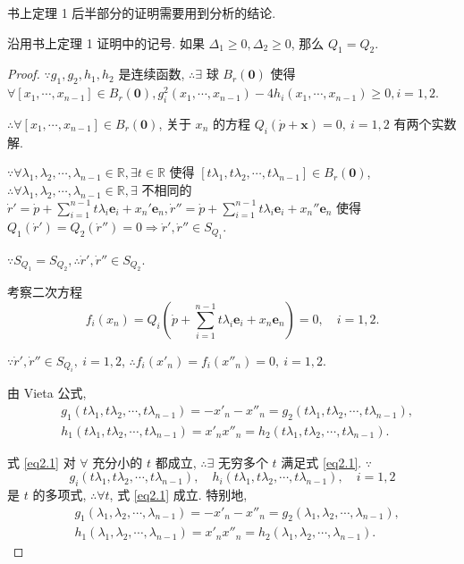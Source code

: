 \documentclass{ctexart}
\begin{document}
书上定理 1 后半部分的证明需要用到分析的结论.
\begin{theorem}
    沿用书上定理 1 证明中的记号. 如果 $\Delta_1\geq0,\Delta_2\geq0$, 那么 $Q_1=Q_2$.
\end{theorem}
\begin{proof}
    $\because g_1,g_2,h_1,h_2$ 是连续函数, $\therefore\exists$ 球 $B_r(\boldsymbol{0})$ 使得 $\forall[x_1,\cdots,x_{n-1}]\in B_r(\boldsymbol{0}),g_i^2(x_1,\cdots,x_{n-1})-4h_i(x_1,\cdots,x_{n-1})\geq0,i=1,2$.

    $\therefore\forall[x_1,\cdots,x_{n-1}]\in B_r(\boldsymbol{0})$, 关于 $x_n$ 的方程 $Q_i(\dot{p}+\boldsymbol{x})=0,\ i=1,2$ 有两个实数解.

    $\because\forall\lambda_1,\lambda_2,\cdots,\lambda_{n-1}\in\mathbb{R},\exists t\in\mathbb{R}$ 使得 $[t\lambda_1,t\lambda_2,\cdots,t\lambda_{n-1}]\in B_r(\boldsymbol{0})$, $\therefore\forall\lambda_1,\lambda_2,\cdots,\lambda_{n-1}\in\mathbb{R},\exists$ 不相同的 $\dot{r}'=\dot{p}+\sum\limits_{i=1}^{n-1}t\lambda_i\boldsymbol{e}_i+x_n'\boldsymbol{e}_n,\dot{r}''=\dot{p}+\sum\limits_{i=1}^{n-1}t\lambda_i\boldsymbol{e}_i+x_n''\boldsymbol{e}_n$ 使得 $Q_1(\dot{r}')=Q_2(\dot{r}'')=0\Rightarrow\dot{r}',\dot{r}''\in S_{Q_1}$.

    $\because S_{Q_1}=S_{Q_2},\therefore\dot{r}',\dot{r}''\in S_{Q_2}$.

    考察二次方程
    \[f_i(x_n)=Q_i\left(\dot{p}+\sum\limits_{i=1}^{n-1}t\lambda_i\boldsymbol{e}_i+x_n\boldsymbol{e}_n\right)=0,\quad i=1,2.\]

    $\because\dot{r}',\dot{r}''\in S_{Q_i},\ i=1,2$, $\therefore f_i(x'_n)=f_i(x''_n)=0,\ i=1,2$.

    由 Vieta 公式,
    \begin{equation}\label{eq2.1}
        \begin{aligned}
            & g_1(t\lambda_1,t\lambda_2,\cdots,t\lambda_{n-1})=-x'_n-x''_n=g_2(t\lambda_1,t\lambda_2,\cdots,t\lambda_{n-1}), \\
            & h_1(t\lambda_1,t\lambda_2,\cdots,t\lambda_{n-1})=x'_nx''_n=h_2(t\lambda_1,t\lambda_2,\cdots,t\lambda_{n-1}).
        \end{aligned}
    \end{equation}

    式 \ref{eq2.1} 对 $\forall$ 充分小的 $t$ 都成立, $\therefore\exists$ 无穷多个 $t$ 满足式 \ref{eq2.1}. $\because$
    \[g_i(t\lambda_1,t\lambda_2,\cdots,t\lambda_{n-1}),\quad h_i(t\lambda_1,t\lambda_2,\cdots,t\lambda_{n-1}),\quad i=1,2\]
    是 $t$ 的多项式, $\therefore\forall t$, 式 \ref{eq2.1} 成立. 特别地,
    \begin{equation}\label{eq2.2}
        \begin{aligned}
            & g_1(\lambda_1,\lambda_2,\cdots,\lambda_{n-1})=-x'_n-x''_n=g_2(\lambda_1,\lambda_2,\cdots,\lambda_{n-1}), \\
            & h_1(\lambda_1,\lambda_2,\cdots,\lambda_{n-1})=x'_nx''_n=h_2(\lambda_1,\lambda_2,\cdots,\lambda_{n-1}).
        \end{aligned}
    \end{equation}


\end{proof}
\end{document}
